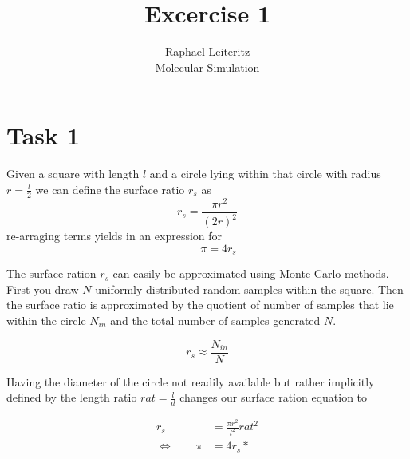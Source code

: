 \documentclass[12pt]{article}
\begin{document}


\title{Excercise 1}%
\author{Raphael Leiteritz\\ %
Molecular Simulation} %

\maketitle

\section{Task 1}

Given a square with length $l$ and a circle lying within that circle with radius $r = \frac{l}{2}$ we can define the surface ratio $r_s$ as
\begin{equation}
	r_s = \frac{\pi r^2}{(2r)^2}
\end{equation}
re-arraging terms yields in an expression for
\begin{equation}
\qquad	\pi = 4r_s
\end{equation}

The surface ration $r_s$ can easily be approximated using Monte Carlo methods. First you draw $N$ uniformly distributed random samples within the square. Then the surface ratio is approximated by the quotient of number of samples that lie within the circle $N_{in}$ and the total number of samples generated $N$.

\begin{equation}
	r_s \approx \frac{N_{in}}{N}
\end{equation}

Having the diameter of the circle not readily available but rather implicitly defined by the length ratio $rat = \frac{l}{d}$ changes our surface ration equation to

\begin{align*}
	r_s &= \frac{\pi r^2}{l^2} rat^2 \\
	\Leftrightarrow \qquad \pi &= 4r_s*
\end{align*}
\end{document}
